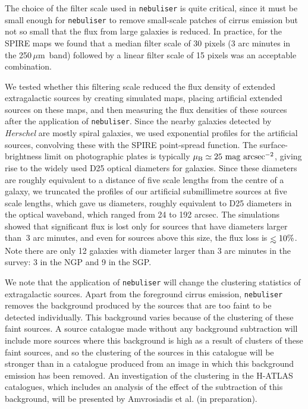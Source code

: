 \documentclass[a4paper,fleqn,usenatbib, twocolumn]{aastex61}
\def\lesssim{\mathrel{\hbox{\rlap{\hbox{\lower4pt\hbox{$\sim$}}}\hbox{$<$}}}}
\def\mic{\,$\mu $m}
\begin{document}
The choice of the filter scale used in {\tt nebuliser} is quite
critical, since it must be small enough for {\tt nebuliser} to remove
small-scale patches of cirrus emission but not so small that the flux
from large galaxies is reduced.  In practice, for the SPIRE maps we
found that a median filter scale of 30 pixels (3 arc minutes in the
250\mic\ band) followed by a linear filter scale of 15 pixels was an
acceptable combination.

We tested whether this filtering scale reduced the flux density of
extended extragalactic sources by creating simulated maps, placing
artificial extended sources on these maps, and then measuring the flux
densities of these sources after the application of {\tt nebuliser}.
Since the nearby galaxies detected by {\it Herschel} are mostly spiral
galaxies, we used exponential profiles for the artificial sources,
convolving these with the SPIRE point-spread function.  The
surface-brightness limit on photographic plates is typically
$\rm \mu_B \simeq 25\ mag\ arcsec^{-2}$, giving rise to the widely
used D25 optical diameters for galaxies.  Since these diameters are
roughly equivalent to a distance of five scale lengths from the centre
of a galaxy, we truncated the profiles of our artificial submillimetre
sources at five scale lengths, which gave us diameters, roughly
equivalent to D25 diameters in the optical waveband, which ranged from
24 to 192 arcsec.  The simulations showed that significant flux is
lost only for sources that have diameters larger than $~3$ arc
minutes, and even for sources above this size, the flux loss is
$\lesssim 10\%$. Note there are only 12 galaxies with diameter larger
than 3 arc minutes in the survey: 3 in the NGP and 9 in the SGP. 

We note that the application of {\tt nebuliser} will change the
clustering statistics of extragalactic sources.  Apart from the
foreground cirrus emission, {\tt nebuliser} removes the background
produced by the sources that are too faint to be detected
individually. This background varies because of the clustering of
these faint sources.  A source catalogue made without any background
subtraction will include more sources where this background is high as
a result of clusters of these faint sources, and so the clustering of
the sources in this catalogue will be stronger than in a catalogue
produced from an image in which this background emission has been
removed. An investigation of the clustering in the H-ATLAS catalogues,
which includes an analysis of the effect of the subtraction of this
background, will be presented by Amvrosiadis et al. (in preparation).
\end{document}
